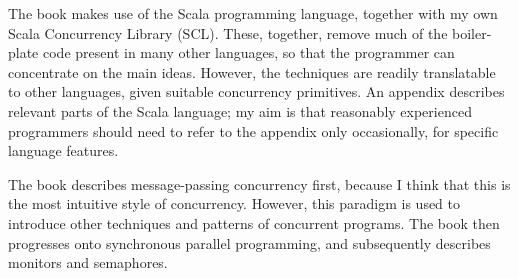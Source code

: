 \documentclass[12pt,a4paper]{article}
\begin{document}
The book makes use of the Scala programming language, together with my own
Scala Concurrency Library (SCL).  These, together, remove much of the
boiler-plate code present in many other languages, so that the programmer can
concentrate on the main ideas.  However, the techniques are readily
translatable to other languages, given suitable concurrency primitives.  An
appendix describes relevant parts of the Scala language; my aim is that
reasonably experienced programmers should need to refer to the appendix only
occasionally, for specific language features.

The book describes message-passing concurrency first, because I think that
this is the most intuitive style of concurrency.  However, this paradigm is
used to introduce other techniques and patterns of concurrent programs.  The
book then progresses onto synchronous parallel programming, and subsequently
describes monitors and semaphores.
\end{document}
